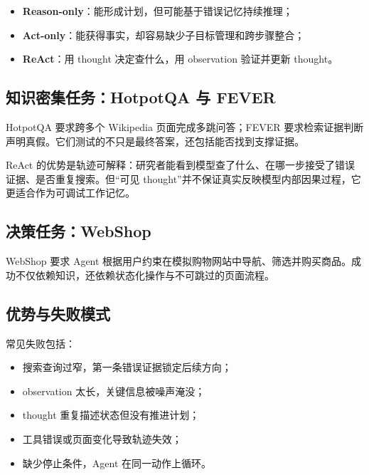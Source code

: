 
\begin{itemize}
    \item \textbf{Reason-only}：能形成计划，但可能基于错误记忆持续推理；
    \item \textbf{Act-only}：能获得事实，却容易缺少子目标管理和跨步骤整合；
    \item \textbf{ReAct}：用 thought 决定查什么，用 observation 验证并更新 thought。
\end{itemize}

\subsection{知识密集任务：HotpotQA 与 FEVER}

HotpotQA 要求跨多个 Wikipedia 页面完成多跳问答；FEVER 要求检索证据判断声明真假。它们测试的不只是最终答案，还包括能否找到支撑证据。


ReAct 的优势是轨迹可解释：研究者能看到模型查了什么、在哪一步接受了错误证据、是否重复搜索。但“可见 thought”并不保证真实反映模型内部因果过程，它更适合作为可调试工作记忆。

\subsection{决策任务：WebShop}

WebShop 要求 Agent 根据用户约束在模拟购物网站中导航、筛选并购买商品。成功不仅依赖知识，还依赖状态化操作与不可跳过的页面流程。


\subsection{优势与失败模式}


常见失败包括：

\begin{itemize}
    \item 搜索查询过窄，第一条错误证据锁定后续方向；
    \item observation 太长，关键信息被噪声淹没；
    \item thought 重复描述状态但没有推进计划；
    \item 工具错误或页面变化导致轨迹失效；
    \item 缺少停止条件，Agent 在同一动作上循环。
\end{itemize}


